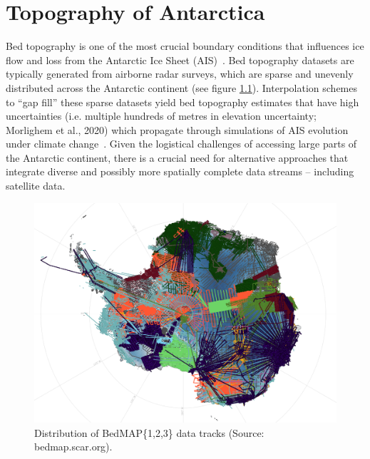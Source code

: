 \chapter{Topography of Antarctica}\label{review}
Bed topography is one of the most crucial boundary conditions that influences ice flow and loss from the Antarctic Ice Sheet (AIS)~\cite{Morlighem_2020}. Bed topography datasets are typically generated from airborne radar surveys, which are sparse and unevenly distributed across the Antarctic continent (see figure \ref{fig:BedMAP}). Interpolation schemes to ``gap fill'' these sparse datasets yield bed topography estimates that have high uncertainties (i.e. multiple hundreds of metres in elevation uncertainty; Morlighem et al., 2020) which propagate through simulations of AIS evolution under climate change~\cite{Castleman_2022}. Given the logistical challenges of accessing large parts of the Antarctic continent, there is a crucial need for alternative approaches that integrate diverse and possibly more spatially complete data streams – including satellite data.
\begin{figure}[H]
    \includegraphics[scale=0.31]{bedmap.png}
    \caption{Distribution of BedMAP\{1,2,3\} data tracks (Source: bedmap.scar.org).}
    \label{fig:BedMAP}
\end{figure}

